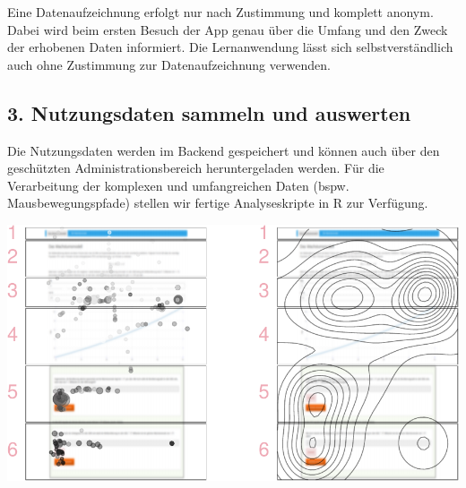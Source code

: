 \documentclass[a0,portrait]{a0poster}
\begin{document}
\begin{multicols}{2}
Eine Datenaufzeichnung erfolgt nur nach Zustimmung und komplett anonym. Dabei wird beim ersten Besuch der App genau über die Umfang und den Zweck der erhobenen Daten informiert. Die Lernanwendung lässt sich selbstverständlich auch ohne Zustimmung zur Datenaufzeichnung verwenden.


\subsection*{3. Nutzungsdaten sammeln und auswerten}

Die Nutzungsdaten werden im Backend gespeichert und können auch über den geschützten Administrationsbereich heruntergeladen werden. Für die Verarbeitung der komplexen und umfangreichen Daten (bspw. Mausbewegungspfade) stellen wir fertige Analyseskripte in R zur Verfügung.

\begin{center}\vspace{1cm}
\includegraphics[width=0.5\linewidth]{figtraj-1}
\end{center}\vspace{1cm}




%
%
%


\end{multicols}
\end{document}
